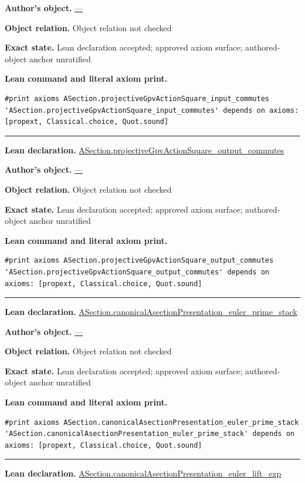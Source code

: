 \documentclass[11pt]{article}
\theoremstyle{plain}
\theoremstyle{definition}
\theoremstyle{remark}
\begin{document}
\begin{tcolorbox}
\par\textbf{Author's object.} \url{—}
\par\textbf{Object relation.} Object relation not checked
\par\textbf{Exact state.} Lean declaration accepted; approved axiom surface; authored-object anchor unratified
\par\smallskip\textbf{Lean command and literal axiom print.}
\begin{Verbatim}[breaklines=true,breakanywhere=true,fontsize=\small]
#print axioms ASection.projectiveGpvActionSquare_input_commutes
'ASection.projectiveGpvActionSquare_input_commutes' depends on axioms: [propext, Classical.choice, Quot.sound]
\end{Verbatim}
\medskip\hrule\medskip
\textbf{Lean declaration.} \url{ASection.projectiveGpvActionSquare_output_commutes}
\par\textbf{Author's object.} \url{—}
\par\textbf{Object relation.} Object relation not checked
\par\textbf{Exact state.} Lean declaration accepted; approved axiom surface; authored-object anchor unratified
\par\smallskip\textbf{Lean command and literal axiom print.}
\begin{Verbatim}[breaklines=true,breakanywhere=true,fontsize=\small]
#print axioms ASection.projectiveGpvActionSquare_output_commutes
'ASection.projectiveGpvActionSquare_output_commutes' depends on axioms: [propext, Classical.choice, Quot.sound]
\end{Verbatim}
\medskip\hrule\medskip
\textbf{Lean declaration.} \url{ASection.canonicalAsectionPresentation_euler_prime_stack}
\par\textbf{Author's object.} \url{—}
\par\textbf{Object relation.} Object relation not checked
\par\textbf{Exact state.} Lean declaration accepted; approved axiom surface; authored-object anchor unratified
\par\smallskip\textbf{Lean command and literal axiom print.}
\begin{Verbatim}[breaklines=true,breakanywhere=true,fontsize=\small]
#print axioms ASection.canonicalAsectionPresentation_euler_prime_stack
'ASection.canonicalAsectionPresentation_euler_prime_stack' depends on axioms: [propext, Classical.choice, Quot.sound]
\end{Verbatim}
\medskip\hrule\medskip
\textbf{Lean declaration.} \url{ASection.canonicalAsectionPresentation_euler_lift_exp}

\end{tcolorbox}
\end{document}
